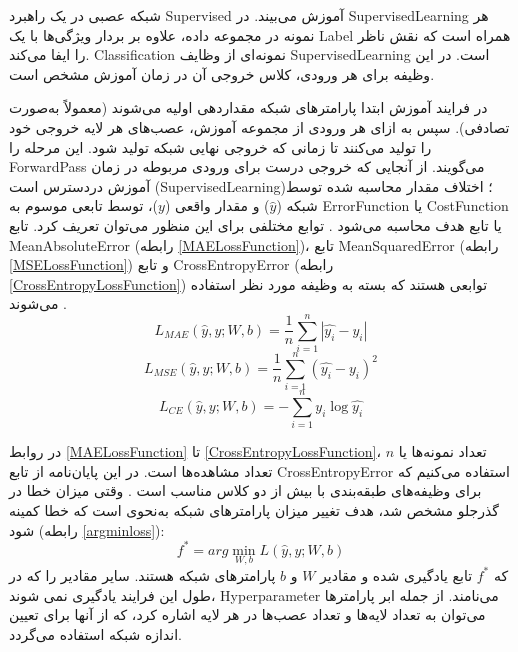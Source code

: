  
 شبکه عصبی در یک راهبرد \gls{Supervised} آموزش می‌بیند. در \gls{SupervisedLearning} هر نمونه در مجموعه داده، علاوه بر بردار ویژگی‌ها با یک \gls{Label} همراه است که نقش ناظر را ایفا می‌کند. \gls{Classification} نمونه‌ای از وظایف \gls{SupervisedLearning} است. در این وظیفه برای هر ورودی، کلاس خروجی آن در زمان آموزش مشخص است.
 
 
 در فرایند آموزش ابتدا پارامترهای شبکه مقداردهی اولیه می‌شوند (معمولاً به‌صورت تصادفی). سپس به ازای هر ورودی از مجموعه آموزش، عصب‌های هر لایه خروجی خود را تولید می‌کنند تا زمانی که خروجی نهایی شبکه تولید شود. این مرحله را \gls{ForwardPass} می‌گویند. از آنجایی که خروجی درست برای ورودی مربوطه در زمان آموزش دردسترس است (\gls{SupervisedLearning})؛ اختلاف مقدار محاسبه شده توسط شبکه ($ \hat{y} $) و مقدار واقعی ($ y $)، توسط تابعی موسوم به \gls{ErrorFunction} یا \gls{CostFunction} یا تابع هدف محاسبه می‌شود \cite{Karpathy2016}. توابع مختلفی برای این منظور می‌توان تعریف کرد. 
 تابع \gls{MeanAbsoluteError} (رابطه \ref{MAELossFunction})، تابع \gls{MeanSquaredError} (رابطه \ref{MSELossFunction}) و تابع \gls{CrossEntropyError} (رابطه \ref{CrossEntropyLossFunction}) توابعی هستند که بسته به وظیفه مورد نظر استفاده می‌شوند \cite{Sautermeister2016}.
\begin{equation}\label{MAELossFunction}
	L_{MAE}(\hat{y}, y; W,b)=\frac{1}{n}\sum_{i=1}^{n}|\hat{y_{i}}-y_{i}|
\end{equation}
\begin{equation}\label{MSELossFunction}
L_{MSE}(\hat{y}, y; W,b)=\frac{1}{n}\sum_{i=1}^{n}(\hat{y_{i}}-y_{i})^2
\end{equation}
\begin{equation}\label{CrossEntropyLossFunction}
L_{CE}(\hat{y}, y; W,b)=-\sum_{i=1}^{n}y_i\log{\hat{y_{i}}}
\end{equation}
 
 در روابط \ref{MAELossFunction} تا \ref{CrossEntropyLossFunction}، $ n $ تعداد نمونه‌ها یا تعداد مشاهده‌ها است. در این پایان‌نامه از تابع \gls{CrossEntropyError} استفاده می‌کنیم که برای وظیفه‌های طبقه‌بندی با بیش از دو کلاس مناسب‌ است \cite{Karpathy2016}. وقتی میزان خطا در گذرجلو مشخص شد، هدف تغییر میزان پارامترهای شبکه به‌نحوی است که خطا کمینه شود (رابطه \ref{argminloss}):
 \begin{equation}\label{argminloss}
 	f^{*} = arg \min_{W,b} L(\hat{y}, y; W,b)
 \end{equation}
که $ f^{*} $ تابع یادگیری شده و مقادیر $ W $ و $ b $ پارامترهای شبکه هستند. سایر مقادیر را که در طول این فرایند یادگیری نمی شوند، \gls{Hyperparameter} می‌نامند. از جمله ابر پارامترها می‌توان به تعداد لایه‌ها و تعداد عصب‌ها در هر لایه اشاره کرد، که از آنها برای تعیین اندازه شبکه استفاده می‌‌گردد.
 
